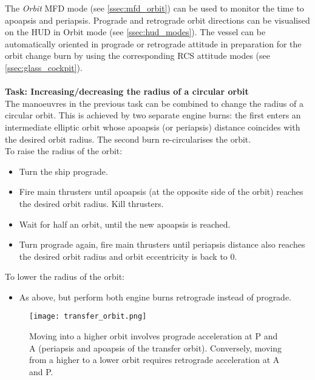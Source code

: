\documentclass[Orbiter User Manual.tex]{subfiles}
\begin{document}
\noindent
The \textit{Orbit} MFD mode (see \ref{ssec:mfd_orbit}) can be used to monitor the time to apoapsis and periapsis.  Prograde and retrograde orbit directions can be visualised on the HUD in Orbit mode (see \ref{ssec:hud_modes}). The vessel can be automatically oriented in prograde or retrograde attitude in preparation for the orbit change burn by using the corresponding RCS attitude modes (see \ref{ssec:glass_cockpit}).\\
\\
\textbf{Task: Increasing/decreasing the radius of a circular orbit}\\
The manoeuvres in the previous task can be combined to change the radius of a circular orbit. This is achieved by two separate engine burns: the first enters an intermediate elliptic orbit whose apoapsis (or periapsis) distance coincides with the desired orbit radius. The second burn re-circularises the orbit.\\
To raise the radius of the orbit:

\begin{itemize}
\item Turn the ship prograde.
\item Fire main thrusters until apoapsis (at the opposite side of the orbit) reaches the desired orbit radius. Kill thrusters.
\item Wait for half an orbit, until the new apoapsis is reached.
\item Turn prograde again, fire main thrusters until periapsis distance also reaches the desired orbit radius and orbit eccentricity is back to 0.
\end{itemize}

\noindent
To lower the radius of the orbit:

\begin{itemize}
\item As above, but perform both engine burns retrograde instead of prograde.
\end{itemize}

\begin{figure}[H]
	\centering
	\texttt{[image: transfer\_orbit.png]}
	\caption{Moving into a higher orbit involves prograde acceleration at P and A (periapsis and apoapsis of the transfer orbit). Conversely, moving from a higher to a lower orbit requires retrograde acceleration at A and P.}
\end{figure}
\end{document}
